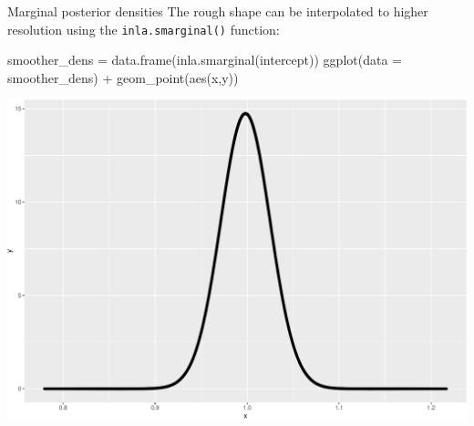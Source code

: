 \documentclass[
  handout]{beamer}
\newenvironment{Shaded}{\begin{snugshade}}{\end{snugshade}}
\newcommand{\AttributeTok}[1]{\textcolor[rgb]{0.77,0.63,0.00}{#1}}
\newcommand{\FunctionTok}[1]{\textcolor[rgb]{0.00,0.00,0.00}{#1}}
\newcommand{\NormalTok}[1]{#1}
\newcommand{\OtherTok}[1]{\textcolor[rgb]{0.56,0.35,0.01}{#1}}
\newcommand{\SpecialCharTok}[1]{\textcolor[rgb]{0.00,0.00,0.00}{#1}}
\begin{document}
\begin{frame}[fragile]{Marginal posterior densities}
\protect\hypertarget{marginal-posterior-densities-1}{}
The rough shape can be interpolated to higher resolution using the
\texttt{inla.smarginal()} function:

\begin{Shaded}
\begin{Highlighting}[]
\NormalTok{smoother\_dens }\OtherTok{=} \FunctionTok{data.frame}\NormalTok{(}\FunctionTok{inla.smarginal}\NormalTok{(intercept))}
\FunctionTok{ggplot}\NormalTok{(}\AttributeTok{data =}\NormalTok{ smoother\_dens) }\SpecialCharTok{+} \FunctionTok{geom\_point}\NormalTok{(}\FunctionTok{aes}\NormalTok{(x,y))}
\end{Highlighting}
\end{Shaded}

\begin{center}\includegraphics[width=0.6\linewidth]{Part2_RINLA_files/figure-beamer/unnamed-chunk-26-1} \end{center}
\end{frame}
\end{document}
